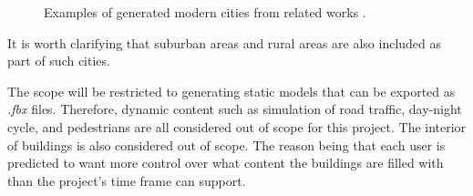 \begin{figure}[h!]
  \centering

  \begin{subfigure}[b]{0.48\textwidth}
  \end{subfigure}
  \quad
  \begin{subfigure}[b]{0.48\textwidth}
  \end{subfigure}

  \caption{Examples of generated modern cities from related works \cite{yoav_and_pascal}\cite{cl3ver}.}
  \label{fig:ModernCities}
\end{figure}

It is worth clarifying that suburban areas and rural areas are also included as
part of such cities.

The scope will be restricted to generating static models that can be exported as \textit{.fbx} files.
Therefore, dynamic content such as simulation of road traffic, day-night cycle, and pedestrians are all considered out of scope for this project.
The interior of buildings is also considered out of scope.
The reason being that each user is predicted to want more control over what content the buildings are filled with than the project's time frame can support.

